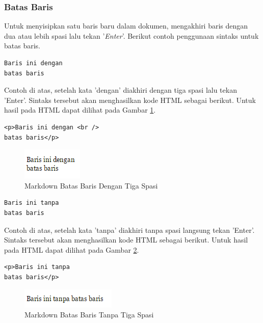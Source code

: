 \subsubsection{Batas Baris}
Untuk menyisipkan satu baris baru dalam dokumen, mengakhiri baris dengan dua
atau lebih spasi lalu tekan '{\it Enter}'. Berikut contoh penggunaan sintaks
untuk batas baris.
\begin{lstlisting}
Baris ini dengan   
batas baris
\end{lstlisting}
Contoh di atas, setelah kata 'dengan' diakhiri dengan tiga spasi lalu tekan
'Enter'. Sintaks tersebut akan menghasilkan kode HTML sebagai berikut. Untuk
hasil pada HTML dapat dilihat pada Gambar \ref{fig:dengan}.
\begin{lstlisting}
<p>Baris ini dengan <br />
batas baris</p>
\end{lstlisting}
\begin{figure}[H]
\centering
\includegraphics[scale=1]{Gambar/dengan.png}
\caption[Markdown Batas Baris Dengan Tiga Spasi]{Markdown Batas Baris
Dengan Tiga Spasi}
\label{fig:dengan}
\end{figure}
\begin{lstlisting}
Baris ini tanpa
batas baris
\end{lstlisting}
Contoh di atas, setelah kata 'tanpa' diakhiri tanpa spasi langsung tekan
'Enter'. Sintaks tersebut akan menghasilkan kode HTML sebagai berikut. Untuk
hasil pada HTML dapat dilihat pada Gambar \ref{fig:tanpa}.
\begin{lstlisting}
<p>Baris ini tanpa
batas baris</p>
\end{lstlisting}
\begin{figure}[H]
\centering
\includegraphics[scale=1]{Gambar/tanpa.png}
\caption[Markdown Batas Baris Tanpa Tiga Spasi]{Markdown Batas Baris
Tanpa Tiga Spasi}
\label{fig:tanpa}
\end{figure}

